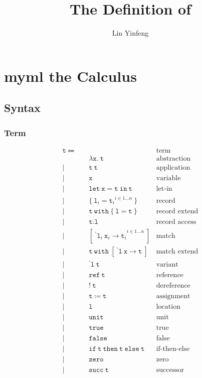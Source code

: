 \documentclass{report}
\title{The Definition of \theLang}
\author{Lin Yinfeng}
\newcommand{\theLang}{myml}
\newcommand{\code}{\mathtt}
\newcommand{\backtick}{{}^{\backprime}}
\begin{document}
\maketitle

\tableofcontents

\chapter{\theLang{} the Calculus}

\section{Syntax}

\subsection{Term}

\begin{align*}
\code{t} \Coloneqq \quad & & \text{term} \\
& \code{\lambda x.\ t} & \text{abstraction} \\
| \quad & \code{t\ t} & \text{application} \\
| \quad & \code{x} & \text{variable} \\
| \quad & \code{let\ x = t\ in\ t} & \text{let-in} \\
| \quad & \{\ {\code{l}_i = \code{t}_i}^{i \in 1\dots n}\ \} & \text{record} \\
| \quad & \code{t\ with\ \{\ l = t\ \}} & \text{record extend} \\
| \quad & \code{t.l} & \text{record access} \\
| \quad & [ {\code{\ \backtick l}_i\ \code{x}_i \rightarrow \code{t}_i}^{i \in 1\dots n} \ ] & \text{match} \\
| \quad & \code{t\ with\ [\ \backtick l\ x \rightarrow t\ ]} & \text{match extend} \\
| \quad & \code{\backtick l\ t} & \text{variant} \\
| \quad & \code{ref\ t} & \text{reference} \\
| \quad & \code{!\ t} & \text{dereference} \\
| \quad & \code{t \coloneqq t} & \text{assignment} \\
| \quad & \code{l} & \text{location} \\
| \quad & \code{unit} & \text{unit} \\
| \quad & \code{true} & \text{true} \\
| \quad & \code{false} & \text{false} \\
| \quad & \code{if\ t\ then\ t\ else\ t} & \text{if-then-else} \\
| \quad & \code{zero} & \text{zero} \\
| \quad & \code{succ\ t} & \text{successor}
\end{align*}
\end{document}

